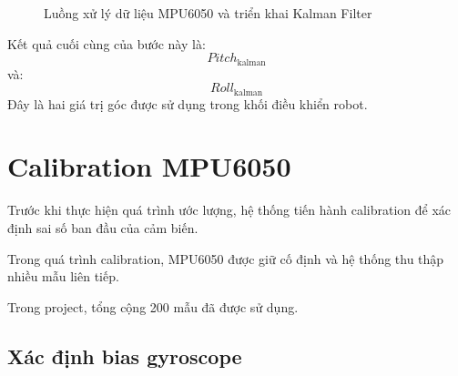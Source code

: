 \begin{figure}[H]

    \caption{Luồng xử lý dữ liệu MPU6050 và triển khai Kalman Filter}
    \label{fig:mpu6050_kalman}
\end{figure}

Kết quả cuối cùng của bước này là:
\begin{equation}
Pitch_{\text{kalman}}
\end{equation}
và:
\begin{equation}
Roll_{\text{kalman}}
\end{equation}
Đây là hai giá trị góc được sử dụng trong khối điều khiển robot.


\section{Calibration MPU6050}
\label{sec:calibration}

Trước khi thực hiện quá trình ước lượng, hệ thống tiến hành calibration để xác định sai số ban đầu của cảm biến.

Trong quá trình calibration, MPU6050 được giữ cố định và hệ thống thu thập nhiều mẫu liên tiếp.

Trong project, tổng cộng 200 mẫu đã được sử dụng.


\subsection{Xác định bias gyroscope}

